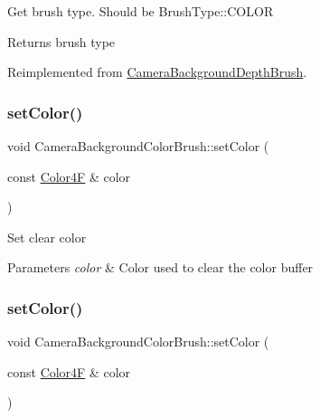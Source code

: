 Get brush type. Should be Brush\+Type\+::\+C\+O\+L\+OR \begin{DoxyReturn}{Returns}
brush type 
\end{DoxyReturn}


Reimplemented from \hyperlink{classCameraBackgroundDepthBrush_ad4cc258ce1a1cd3ac43ea0d2580409d5}{Camera\+Background\+Depth\+Brush}.

\mbox{\label{classCameraBackgroundColorBrush_a893195becfc210703450698a8537e5bc}} 
\subsubsection{\texorpdfstring{set\+Color()}{setColor()}\hspace{0.1cm}{\footnotesize\ttfamily [1/2]}}
{\footnotesize\ttfamily void Camera\+Background\+Color\+Brush\+::set\+Color (\begin{DoxyParamCaption}\item[{const \hyperlink{structColor4F}{Color4F} \&}]{color }\end{DoxyParamCaption})}

Set clear color 
\begin{DoxyParams}{Parameters}
{\em color} & Color used to clear the color buffer \\
\hline
\end{DoxyParams}
\mbox{\label{classCameraBackgroundColorBrush_a893195becfc210703450698a8537e5bc}} 
\subsubsection{\texorpdfstring{set\+Color()}{setColor()}\hspace{0.1cm}{\footnotesize\ttfamily [2/2]}}
{\footnotesize\ttfamily void Camera\+Background\+Color\+Brush\+::set\+Color (\begin{DoxyParamCaption}\item[{const \hyperlink{structColor4F}{Color4F} \&}]{color }\end{DoxyParamCaption})}

